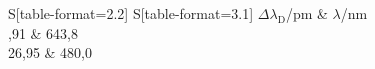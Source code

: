 \begin{table}
	\centering
	\caption{Dispersionsgebiet der Lummer-Gehrcke-Platte.}
	\label{tab:disp}
	\begin{tabular}{
		S[table-format=2.2]
		S[table-format=3.1]
		}
	\toprule
		{$\Delta\lambda_\text{D}$\;/\;\si{\pico\meter}} & {$\lambda$\;/\;\si{\nano\meter}} \\
	,91 &  643,8 \\
         26,95 &  480,0 \\
	\bottomrule
	\end{tabular}
\end{table} 
